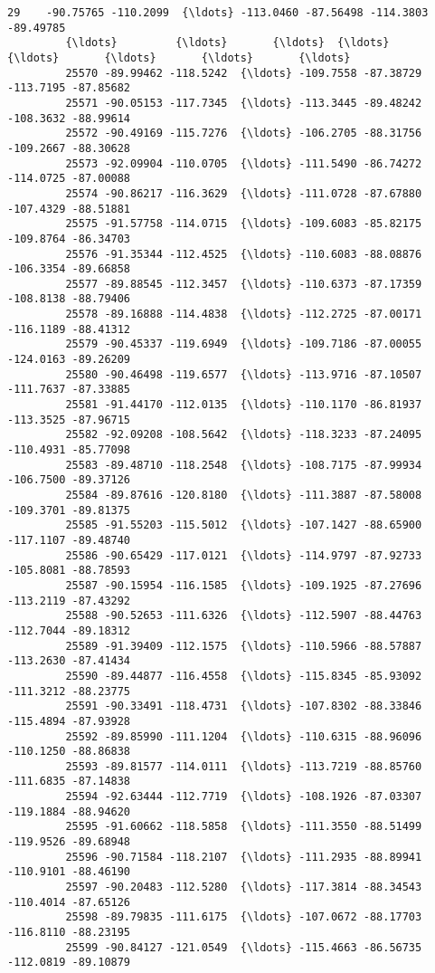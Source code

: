 \documentclass[11pt]{article}
\begin{document}
\begin{Verbatim}[commandchars=\\\{\}]
         29    -90.75765 -110.2099  {\ldots} -113.0460 -87.56498 -114.3803 -89.49785   
         {\ldots}         {\ldots}       {\ldots}  {\ldots}       {\ldots}       {\ldots}       {\ldots}       {\ldots}   
         25570 -89.99462 -118.5242  {\ldots} -109.7558 -87.38729 -113.7195 -87.85682   
         25571 -90.05153 -117.7345  {\ldots} -113.3445 -89.48242 -108.3632 -88.99614   
         25572 -90.49169 -115.7276  {\ldots} -106.2705 -88.31756 -109.2667 -88.30628   
         25573 -92.09904 -110.0705  {\ldots} -111.5490 -86.74272 -114.0725 -87.00088   
         25574 -90.86217 -116.3629  {\ldots} -111.0728 -87.67880 -107.4329 -88.51881   
         25575 -91.57758 -114.0715  {\ldots} -109.6083 -85.82175 -109.8764 -86.34703   
         25576 -91.35344 -112.4525  {\ldots} -110.6083 -88.08876 -106.3354 -89.66858   
         25577 -89.88545 -112.3457  {\ldots} -110.6373 -87.17359 -108.8138 -88.79406   
         25578 -89.16888 -114.4838  {\ldots} -112.2725 -87.00171 -116.1189 -88.41312   
         25579 -90.45337 -119.6949  {\ldots} -109.7186 -87.00055 -124.0163 -89.26209   
         25580 -90.46498 -119.6577  {\ldots} -113.9716 -87.10507 -111.7637 -87.33885   
         25581 -91.44170 -112.0135  {\ldots} -110.1170 -86.81937 -113.3525 -87.96715   
         25582 -92.09208 -108.5642  {\ldots} -118.3233 -87.24095 -110.4931 -85.77098   
         25583 -89.48710 -118.2548  {\ldots} -108.7175 -87.99934 -106.7500 -89.37126   
         25584 -89.87616 -120.8180  {\ldots} -111.3887 -87.58008 -109.3701 -89.81375   
         25585 -91.55203 -115.5012  {\ldots} -107.1427 -88.65900 -117.1107 -89.48740   
         25586 -90.65429 -117.0121  {\ldots} -114.9797 -87.92733 -105.8081 -88.78593   
         25587 -90.15954 -116.1585  {\ldots} -109.1925 -87.27696 -113.2119 -87.43292   
         25588 -90.52653 -111.6326  {\ldots} -112.5907 -88.44763 -112.7044 -89.18312   
         25589 -91.39409 -112.1575  {\ldots} -110.5966 -88.57887 -113.2630 -87.41434   
         25590 -89.44877 -116.4558  {\ldots} -115.8345 -85.93092 -111.3212 -88.23775   
         25591 -90.33491 -118.4731  {\ldots} -107.8302 -88.33846 -115.4894 -87.93928   
         25592 -89.85990 -111.1204  {\ldots} -110.6315 -88.96096 -110.1250 -88.86838   
         25593 -89.81577 -114.0111  {\ldots} -113.7219 -88.85760 -111.6835 -87.14838   
         25594 -92.63444 -112.7719  {\ldots} -108.1926 -87.03307 -119.1884 -88.94620   
         25595 -91.60662 -118.5858  {\ldots} -111.3550 -88.51499 -119.9526 -89.68948   
         25596 -90.71584 -118.2107  {\ldots} -111.2935 -88.89941 -110.9101 -88.46190   
         25597 -90.20483 -112.5280  {\ldots} -117.3814 -88.34543 -110.4014 -87.65126   
         25598 -89.79835 -111.6175  {\ldots} -107.0672 -88.17703 -116.8110 -88.23195   
         25599 -90.84127 -121.0549  {\ldots} -115.4663 -86.56735 -112.0819 -89.10879   
         

\end{Verbatim}
\end{document}
